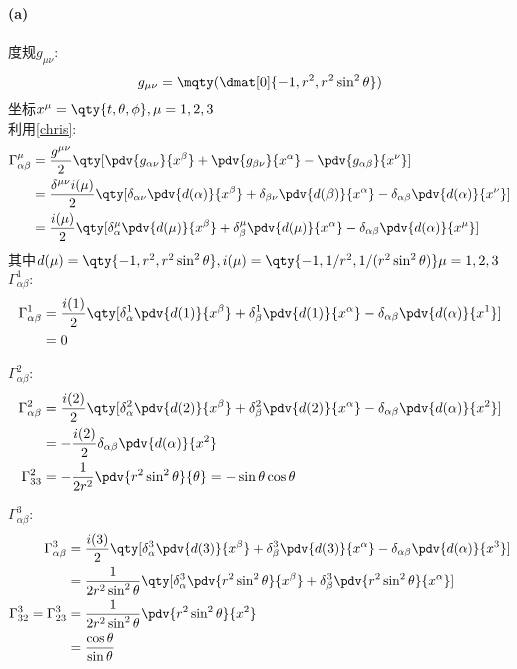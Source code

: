 \paragraph{(a)}
度规$g_{\mu\nu}$:
$$g_{\mu\nu} = \mqty(\dmat[0]{-1, r^2, r^2\sin^2\theta})$$
坐标$x^\mu = \qty{t, \theta, \phi}, \mu = 1,2,3$\\
利用\ref{chris}:
\begin{align*}
    \Gamma^\mu_{\alpha\beta} &= \frac{g^{\mu\nu}}{2}\qty[\pdv{g_{\alpha\nu}}{x^\beta} + \pdv{g_{\beta\nu}}{x^\alpha} - \pdv{g_{\alpha\beta}}{x^\nu}]\\
    &=\frac{\delta^{\mu\nu}i(\mu)}{2}\qty[\delta_{\alpha\nu}\pdv{d(\alpha)}{x^\beta} + \delta_{\beta\nu}\pdv{d(\beta)}{x^\alpha} - \delta_{\alpha\beta}\pdv{d(\alpha)}{x^\nu}]\\
    &=\frac{i(\mu)}{2}\qty[\delta_\alpha^\mu\pdv{d(\mu)}{x^\beta} + \delta_\beta^\mu\pdv{d(\mu)}{x^\alpha} - \delta_{\alpha\beta}\pdv{d(\alpha)}{x^\mu}]
\end{align*}
其中$d(\mu) = \qty{-1, r^2, r^2\sin^2\theta}, i(\mu) = \qty{-1, {1}/{r^2}, {1}/(r^2\sin^2\theta)} \mu = 1, 2, 3$\\
$\Gamma^1_{\alpha\beta}:$
\begin{align*}
    \Gamma^1_{\alpha\beta} &=\frac{i(1)}{2}\qty[\delta_\alpha^1\pdv{d(1)}{x^\beta} + \delta_\beta^1\pdv{d(1)}{x^\alpha} - \delta_{\alpha\beta}\pdv{d(\alpha)}{x^1}]\\
    &=0
\end{align*}

$\Gamma^2_{\alpha\beta}:$
\begin{align*}
    \Gamma^2_{\alpha\beta} &=\frac{i(2)}{2}\qty[\delta_\alpha^2\pdv{d(2)}{x^\beta} + \delta_\beta^2\pdv{d(2)}{x^\alpha} - \delta_{\alpha\beta}\pdv{d(\alpha)}{x^2}]\\
    &=-\frac{i(2)}{2}\delta_{\alpha\beta}\pdv{d(\alpha)}{x^2}\\
    \Gamma^2_{33} &= -\frac{1}{2r^2}\pdv{r^2\sin^2\theta}{\theta} = -\sin\theta\cos\theta
\end{align*}

$\Gamma^3_{\alpha\beta}:$
\begin{align*}
    \Gamma^3_{\alpha\beta} &=\frac{i(3)}{2}\qty[\delta_\alpha^3\pdv{d(3)}{x^\beta} + \delta_\beta^3\pdv{d(3)}{x^\alpha} - \delta_{\alpha\beta}\pdv{d(\alpha)}{x^3}]\\
    &=\frac{1}{2r^2\sin^2\theta}\qty[\delta_\alpha^3\pdv{r^2\sin^2\theta}{x^\beta} + \delta_\beta^3\pdv{r^2\sin^2\theta}{x^\alpha}]\\
    \Gamma^3_{32} = \Gamma^3_{23} &=\frac{1}{2r^2\sin^2\theta}\pdv{r^2\sin^2\theta}{x^2}\\
    & =\frac{\cos\theta}{\sin\theta}
\end{align*}
